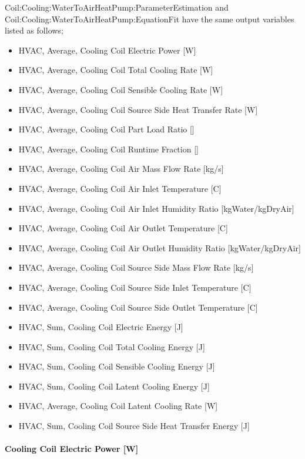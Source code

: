 Coil:Cooling:WaterToAirHeatPump:ParameterEstimation and Coil:Cooling:WaterToAirHeatPump:EquationFit have the same output variables listed as follows;

\begin{itemize}
\item
  HVAC, Average, Cooling Coil Electric Power {[}W{]}
\item
  HVAC, Average, Cooling Coil Total Cooling Rate {[}W{]}
\item
  HVAC, Average, Cooling Coil Sensible Cooling Rate {[}W{]}
\item
  HVAC, Average, Cooling Coil Source Side Heat Transfer Rate {[}W{]}
\item
  HVAC, Average, Cooling Coil Part Load Ratio {[]}
\item
  HVAC, Average, Cooling Coil Runtime Fraction {[]}
\item
  HVAC, Average, Cooling Coil Air Mass Flow Rate {[}kg/s{]}
\item
  HVAC, Average, Cooling Coil Air Inlet Temperature {[}C{]}
\item
  HVAC, Average, Cooling Coil Air Inlet Humidity Ratio {[}kgWater/kgDryAir{]}
\item
  HVAC, Average, Cooling Coil Air Outlet Temperature {[}C{]}
\item
  HVAC, Average, Cooling Coil Air Outlet Humidity Ratio {[}kgWater/kgDryAir{]}
\item
  HVAC, Average, Cooling Coil Source Side Mass Flow Rate {[}kg/s{]}
\item
  HVAC, Average, Cooling Coil Source Side Inlet Temperature {[}C{]}
\item
  HVAC, Average, Cooling Coil Source Side Outlet Temperature {[}C{]}
\item
  HVAC, Sum, Cooling Coil Electric Energy {[}J{]}
\item
  HVAC, Sum, Cooling Coil Total Cooling Energy {[}J{]}
\item
  HVAC, Sum, Cooling Coil Sensible Cooling Energy {[}J{]}
\item
  HVAC, Sum, Cooling Coil Latent Cooling Energy {[}J{]}
\item
  HVAC, Average, Cooling Coil Latent Cooling Rate {[}W{]}
\item
  HVAC, Sum, Cooling Coil Source Side Heat Transfer Energy {[}J{]}
\end{itemize}

\paragraph{Cooling Coil Electric Power {[}W{]}}\label{cooling-coil-electric-power-w-2}

